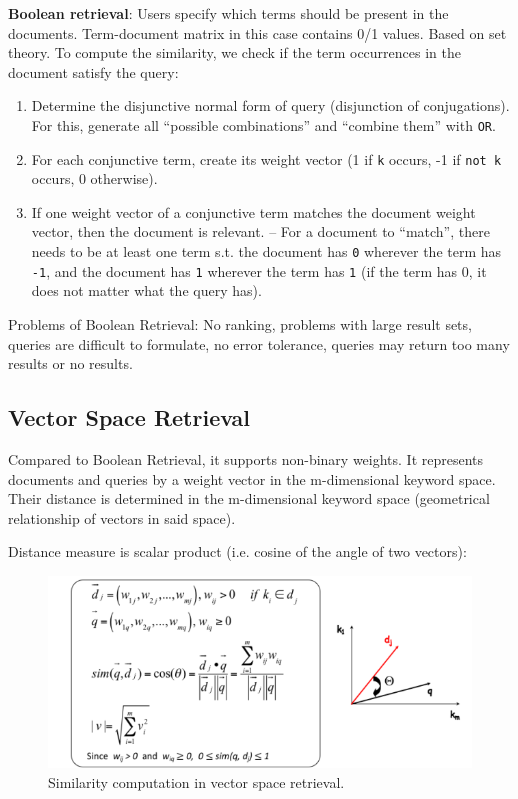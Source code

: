   \textbf{Boolean retrieval}: Users specify which terms should be present in the documents. Term-document matrix in this case contains 0/1 values. Based on set theory. To compute the similarity, we check if the term occurrences in the document satisfy the query:
  \begin{enumerate}
    \item Determine the disjunctive normal form of query (disjunction of conjugations). For this, generate all ``possible combinations'' and ``combine them'' with \texttt{OR}.
    \item For each conjunctive term, create its weight vector (1 if \texttt{k} occurs, -1 if \texttt{not k} occurs, 0 otherwise).
    \item If one weight vector of a conjunctive term matches the document weight vector, then the document is relevant. -- For a document to ``match'', there needs to be at least one term s.t. the document has \texttt{0} wherever the term has \texttt{-1}, and the document has \texttt{1} wherever the term has \texttt{1} (if the term has 0, it does not matter what the query has).
  \end{enumerate}
  Problems of Boolean Retrieval: No ranking, problems with large result sets, queries are difficult to formulate, no error tolerance, queries may return too many results or no results.

  \subsection{Vector Space Retrieval} %
  \label{sub:vector_space_re}
    Compared to Boolean Retrieval, it supports non-binary weights. It represents documents and queries by a weight vector in the m-dimensional keyword space. Their distance is determined in the m-dimensional keyword space (geometrical relationship of vectors in said space).

    Distance measure is scalar product (i.e. cosine of the angle of two vectors):
    \begin{figure}[htp]
      \centering
        \includegraphics[width=\textwidth]{images/simcomp.png}
        \caption{Similarity computation in vector space retrieval.}
        \label{fig:simcomp}
    \end{figure}

